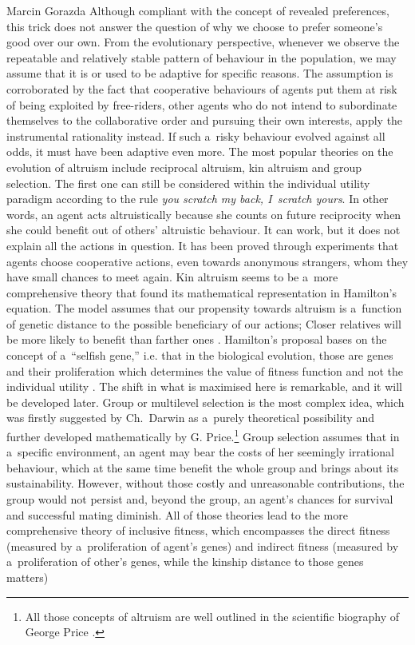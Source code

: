 \begin{artengenv}{Marcin Gorazda}
 Although compliant with the concept of revealed preferences, this trick does not answer the question of why we choose to prefer someone's good over our own. From the evolutionary perspective, whenever we observe the repeatable and relatively stable pattern of behaviour in the population, we may assume that it is or used to be adaptive for specific reasons. The assumption is corroborated by the fact that cooperative behaviours of agents put them at risk of being exploited by free-riders, other agents who do not intend to subordinate themselves to the collaborative order and pursuing their own interests, apply the instrumental rationality instead. If such a~risky behaviour evolved against all odds, it must have been adaptive even more. The most popular theories on the evolution of altruism include reciprocal altruism, kin altruism and group selection. The first one can still be considered within the individual utility paradigm according to the rule \textit{you scratch my back, I~scratch yours}. In other words, an agent acts altruistically because she counts on future reciprocity when she could benefit out of others' altruistic behaviour. It can work, but it does not explain all the actions in question. It has been proved through experiments that agents choose cooperative actions, even towards anonymous strangers, whom they have small chances to meet again. Kin altruism seems to be a~more comprehensive theory that found its mathematical representation in Hamilton's equation. The model assumes that our propensity towards altruism is a~function of genetic distance to the possible beneficiary of our actions; Closer relatives will be more likely to benefit than farther ones 
\parencite[][]{hamilton_genetical_1964}. %
 Hamilton's proposal bases on the concept of a~``selfish gene,'' i.e. that in the biological evolution, those are genes and their proliferation which determines the value of fitness function and not the individual utility 
\parencite[][]{dawkins_selfish_1976}. %
 The shift in what is maximised here is remarkable, and it will be developed later. Group or multilevel selection is the most complex idea, which was firstly suggested by Ch.~Darwin as a~purely theoretical possibility and further developed mathematically by G. Price.\footnote{All those concepts of altruism are well outlined in the scientific biography of George Price 
\parencite[][]{harman_price_2010}.%
} Group selection assumes that in a~specific environment, an agent may bear the costs of her seemingly irrational behaviour, which at the same time benefit the whole group and brings about its sustainability. However, without those costly and unreasonable contributions, the group would not persist and, beyond the group, an agent's chances for survival and successful mating diminish. All of those theories lead to the more comprehensive theory of inclusive fitness, which encompasses the direct fitness (measured by a~proliferation of agent's genes) and indirect fitness (measured by a~proliferation of other's genes, while the kinship distance to those genes matters) 

\end{artengenv}
